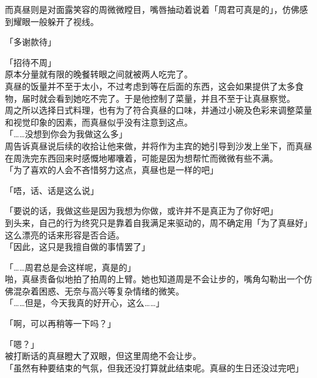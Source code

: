 而真昼则是对面露笑容的周微微瞠目，嘴唇抽动着说着「周君可真是的」，仿佛感到耀眼一般躲开了视线。\\

\vspace{2\baselineskip}

「多谢款待」

「招待不周」\\

原本分量就有限的晚餐转眼之间就被两人吃完了。\\

真昼的饭量并不至于太小，不过考虑到等在后面的东西，这会如果提供了太多食物，届时就会看到她吃不完了。于是他控制了菜量，并且不至于让真昼察觉。\\

周之所以选择日式料理，也有为了符合真昼的口味，并通过小碗及色彩来调整菜量和视觉印象的因素，而真昼似乎没有注意到这点。\\

「……没想到你会为我做这么多」\\

周告诉真昼说后续的收拾让他来做，并将作为主宾的她引导到沙发上坐下，而真昼在周洗完东西回来时感慨地嘟囔着，可能是因为想帮忙而微微有些不满。\\

「为了喜欢的人会不吝惜努力这点，真昼也是一样的吧」

「唔，话、话是这么说」

「要说的话，我做这些是因为我想为你做，或许并不是真正为了你好吧」\\

到头来，自己的行为终究只是靠着自我满足来驱动的，周不确定用「为了真昼好」这么漂亮的话来形容是否合适。\\

「因此，这只是我擅自做的事情罢了」

「……周君总是会这样呢，真是的」\\

啪，真昼责备似地拍了拍周的上臂。她也知道周是不会让步的，嘴角勾勒出一个仿佛混杂着困惑、无奈与高兴等复杂情绪的微笑。\\

「……但是，今天我真的好开心，这么……」

「啊，可以再稍等一下吗？」

「嗯？」\\

被打断话的真昼瞪大了双眼，但这里周绝不会让步。\\

「虽然有种要结束的气氛，但我还没打算就此结束呢。真昼的生日还没过完吧」\\

